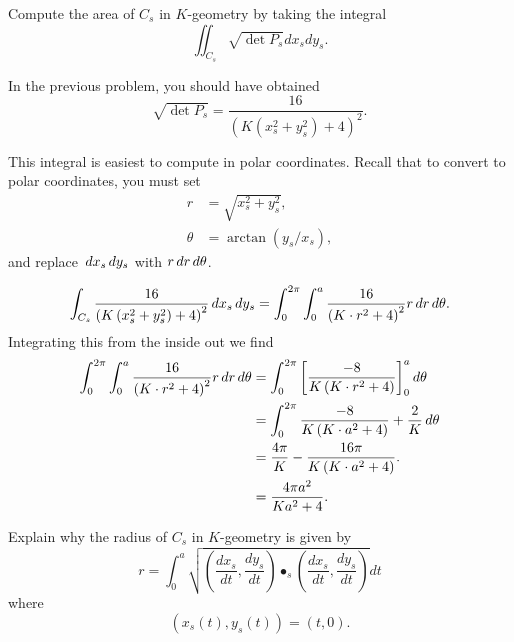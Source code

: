 \documentclass[newpage,hints,handout]{ximera}
\begin{document}
\begin{problem}
  Compute the area of $C_s$ in $K$-geometry by taking the integral
  \[\iint_{C_s} \sqrt{\det P_s}dx_sdy_s.\]
  \begin{hint}
    In the previous problem, you should have obtained
    \[\sqrt{\det P_s}=\frac{16}{(K(x_s^2+y_s^2)+4)^2}.\]
  \end{hint}
  \begin{hint}
    This integral is easiest to compute in polar coordinates.  Recall that to
    convert to polar coordinates, you must set
    \begin{align*}
      r &= \sqrt{x_s^2+y_s^2},\\
      \theta &= \arctan(y_s/x_s),
    \end{align*}
    and replace $\,d x_s\,d y_s$ with $r\,d r\,d \theta$.
  \end{hint}
  \begin{freeResponse}
    \[
    \int_{C_s} \frac{16}{\left(K\left(x_s^2+y_s^2\right)+4\right)^2} \,d x_s\,d y_s
    =\int_0^{2\pi}\int_0^a \frac{16}{\left(K\cdot r^2+4\right)^2} r\,d r \,d \theta.
    \]
    Integrating this from the inside out we find
    \begin{align*}
      \int_0^{2\pi} \int_0^a \frac{16}{\left(K\cdot r^2+4\right)^2} r\,d r \,d \theta
      &= \int_0^{2\pi} \bigg[ \frac{-8}{K\left(K\cdot r^2+4\right)} \bigg]_0^a \,d \theta\\
      &= \int_0^{2\pi} \frac{-8}{K\left(K\cdot a^2+4\right)}+\frac{2}{K} \,d \theta\\
      &= \frac{4\pi}{K}-\frac{16\pi}{K\left(K\cdot a^2+4\right)}. \\
      &= \frac{4\pi a^2}{Ka^2+4}.
    \end{align*}
  \end{freeResponse}
\end{problem}
\begin{problem}
  Explain why the radius of $C_s$ in $K$-geometry is given by
  \[r=\int_0^a \sqrt{\left(\frac{dx_s}{dt},\frac{dy_s}{dt}\right)
    \bullet_s \left(\frac{dx_s}{dt},\frac{dy_s}{dt}\right)}dt\]
  where
  \[(x_s(t),y_s(t))=(t,0).\]
\end{problem}
\end{document}

